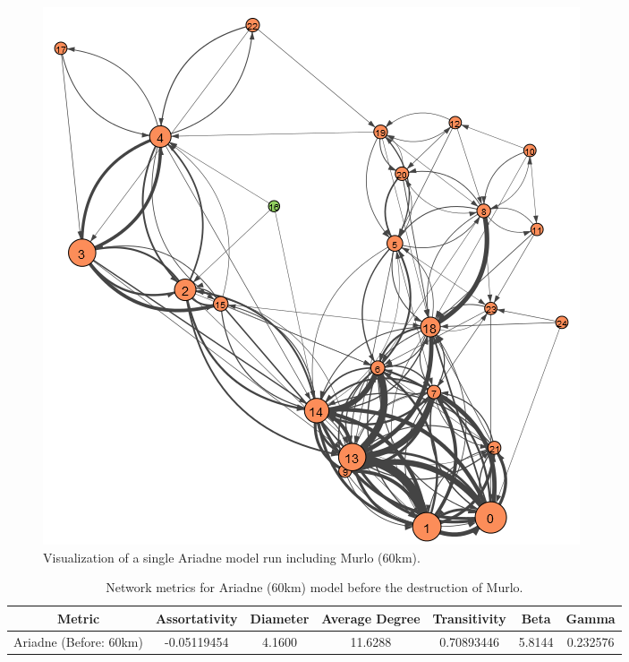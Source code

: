 \documentclass[12pt,a4paper]{thesis}
\begin{document}
\begin{figure}[H]
\centering
\includegraphics[width=0.9\linewidth]{./BeforeViz/ariadne60}
\caption{Visualization of a single Ariadne model run including Murlo (60km).}
\label{fig:ariadneB60}
\end{figure}

\begin{table}[H]
\centering
\caption{Network metrics for Ariadne (60km) model before the destruction of Murlo.}
\tiny
\begin{tabular}{|c|c|c|c|c|c|c|}
\hline Metric & Assortativity & Diameter & Average Degree & Transitivity & Beta & Gamma \\ 
\hline Ariadne (Before: 60km) & -0.05119454	& 4.1600 & 11.6288 & 0.70893446 & 5.8144 & 0.232576\\ 
\hline 
\end{tabular} 
\label{tab:ariadneNetBefore60}
\end{table}
\end{document}
